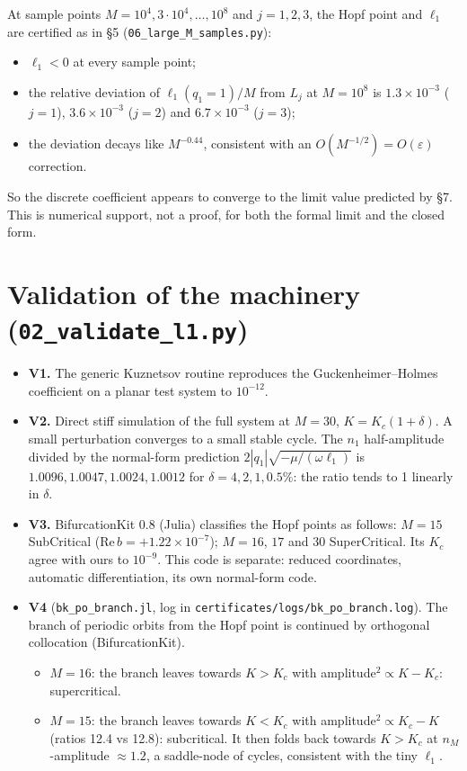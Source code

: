 \documentclass[11pt,a4paper]{report}
\begin{document}
At sample points \(M=10^4,3\cdot10^4,\dots,10^8\) and \(j=1,2,3\), the Hopf point and \(\ell_1\) are certified as in
§5 (\texttt{06\_large\_M\_samples.py}):
\begin{itemize}
\tightlist
\item \(\ell_1<0\) at every sample point;
\item the relative deviation of \(\ell_1(q_1=1)/M\) from \(L_j\) at \(M=10^8\) is \(1.3\times10^{-3}\) (\(j=1\)),
\(3.6\times10^{-3}\) (\(j=2\)) and \(6.7\times10^{-3}\) (\(j=3\));
\item the deviation decays like \(M^{-0.44}\), consistent with an \(O(M^{-1/2})=O(\varepsilon)\) correction.
\end{itemize}

So the discrete coefficient appears to converge to the limit value predicted by §7. This is numerical support, not
a proof, for both the formal limit and the closed form.

\section{\texorpdfstring{Validation of the machinery (\texttt{02\_validate\_l1.py})}{Validation of the machinery (02\_validate\_l1.py)}}

\begin{itemize}
\tightlist
\item
  \textbf{V1.} The generic Kuznetsov routine reproduces the Guckenheimer--Holmes coefficient on a planar test system to
  \(10^{-12}\).
\item
  \textbf{V2.} Direct stiff simulation of the full system at \(M=30\), \(K=K_c(1+\delta)\). A small perturbation converges
  to a small stable cycle. The \(n_1\) half-amplitude divided by the normal-form prediction
  \(2|q_1|\sqrt{-\mu/(\omega\ell_1)}\) is \(1.0096,1.0047,1.0024,1.0012\) for \(\delta=4,2,1,0.5\%\): the ratio tends
  to 1 linearly in \(\delta\).
\item
  \textbf{V3.} BifurcationKit 0.8 (Julia) classifies the Hopf points as follows: \(M=15\) SubCritical (\(\mathrm{Re}\,b=
  +1.22\times10^{-7}\)); \(M=16\), \(17\) and \(30\) SuperCritical. Its \(K_c\) agree with ours to \(10^{-9}\). This
  code is separate: reduced coordinates, automatic differentiation, its own normal-form code.
\item
  \textbf{V4} (\texttt{bk\_po\_branch.jl}, log in \texttt{certificates/logs/bk\_po\_branch.log}). The branch of periodic orbits from the
  Hopf point is continued by orthogonal collocation (BifurcationKit).

  \begin{itemize}
  \tightlist
  \item
    \(M=16\): the branch leaves towards \(K>K_c\) with amplitude\(^2\propto K-K_c\): supercritical.
  \item
    \(M=15\): the branch leaves towards \(K<K_c\) with amplitude\(^2\propto K_c-K\) (ratios 12.4 vs 12.8):
    subcritical. It then folds back towards \(K>K_c\) at \(n_M\)-amplitude \(\approx1.2\), a saddle-node of cycles,
    consistent with the tiny \(\ell_1\).
  \end{itemize}
\end{itemize}
\end{document}
